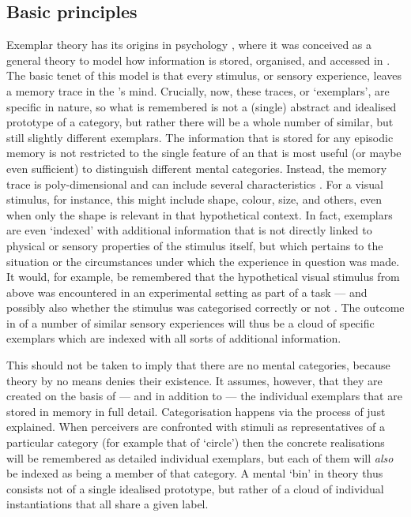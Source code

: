 		\subsection{Basic principles}
		\label{sec.sal.exemplar.basic}
		
Exemplar theory has its origins in psychology \parencite[cf.][]{medinschaffer1978}, where it was conceived as a general theory to model how information is stored, organised, and accessed in .
The basic tenet of this model is that every stimulus, or sensory experience, leaves a memory trace in the 's mind.
Crucially, now, these traces, or `exemplars', are specific in nature, so what is remembered is not a (single) abstract and idealised prototype of a category, but rather there will be a whole number of similar, but still slightly different exemplars.
The information that is stored for any episodic memory is not restricted to the single feature of an  that is most useful (or maybe even sufficient) to distinguish different mental categories.
Instead, the memory trace is poly-dimensional and can include several characteristics \parencite[cf.][517]{pierrehumbert2006}.
For a visual stimulus, for instance, this might include shape, colour, size, and others, even when only the shape is relevant in that hypothetical context.
In fact, exemplars are even `indexed' with additional information that is not directly linked to physical or sensory properties of the stimulus itself, but which pertains to the situation or the circumstances under which the experience in question was made.
It would, for example, be remembered that the hypothetical visual stimulus from above was encountered in an experimental setting as part of a  task --- and possibly also whether the stimulus was categorised correctly or not \parencite[cf.][210--212]{medinschaffer1978}.
The outcome in  of a number of similar sensory experiences will thus be a cloud of specific exemplars which are indexed with all sorts of additional information.

This should not be taken to imply that there are no mental categories, because  theory by no means denies their existence.
It assumes, however, that they are created on the basis of --- and in addition to --- the individual exemplars that are stored in memory in full detail.
Categorisation happens via the process of  just explained.
When perceivers are confronted with stimuli as representatives of a particular category (for example that of `circle') then the concrete realisations will be remembered as detailed individual exemplars, but each of them will \emph{also} be indexed as being a member of that category.
A mental `bin' in  theory thus consists not of a single idealised prototype, but rather of a cloud of individual instantiations that all share a given label.

